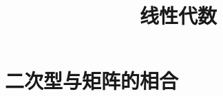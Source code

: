 \documentclass[aspectratio=169,handout]{ctexbeamer}
\title{线性代数}
\begin{document}
\setcounter{part}{4}
\part{二次型与矩阵的相合}



\end{document}
